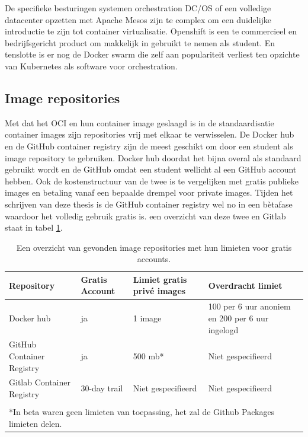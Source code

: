 De specifieke besturingen systemen orchestration DC/OS of een volledige datacenter opzetten met Apache Mesos zijn te complex om een duidelijke introductie te zijn tot container virtualisatie.  Openshift is een te commercieel en bedrijfsgericht product om makkelijk in gebruikt te nemen als student. En tenslotte is er nog de Docker swarm die zelf aan populariteit verliest ten opzichte van Kubernetes als software voor orchestration.



\subsection{Image repositories}
Met dat het OCI en hun container image geslaagd is in de standaardisatie container images zijn repositories vrij met elkaar te verwisselen. De Docker hub en de GitHub container registry zijn de meest geschikt om door een student als image repository te gebruiken.  Docker hub doordat het bijna overal als standaard gebruikt wordt en de GitHub omdat een student wellicht al een GitHub account hebben. Ook de kostenstructuur van de twee is te vergelijken met gratis publieke images en betaling vanaf een bepaalde drempel voor private images. Tijden het schrijven van deze thesis is de GitHub container registry wel no in een bètafase waardoor het volledig gebruik gratis is. een overzicht van deze twee en Gitlab staat in tabel \ref{tab:repositories}.

\begin{center}
    \begin{table}
        \begin{tabular}{ m{3.5cm} || m{2cm} | m{3.3cm} | m{4.5cm} }
            Repository & Gratis Account & Limiet gratis privé images & Overdracht limiet \\ 
            \hline
            Docker hub & ja & 1 image & 100 per 6 uur anoniem en 200 per 6 uur ingelogd
             \\  
            \hline
            GitHub Container Registry & ja & 500 mb* & Niet gespecifieerd \\
            \hline 
            Gitlab Container Registry & 30-day trail & Niet gespecifieerd & Niet gespecifieerd \\
            \multicolumn{4}{c}{ } \\
            \multicolumn{4}{l}{*In beta waren geen limieten van toepassing, het zal de Github Packages limieten delen.} \\
        \end{tabular}
        \label{tab:repositories}
        \caption[Overzicht image repositories]{Een overzicht van gevonden image repositories met hun limieten voor gratis accounts.}
    \end{table}
\end{center}

